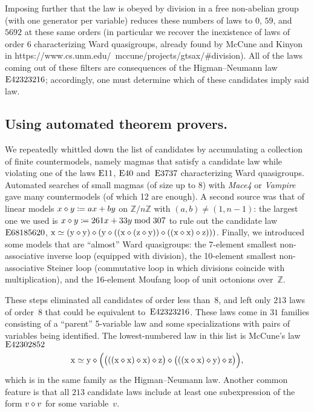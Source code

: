 Imposing further that the law is obeyed by division in a free non-abelian group (with one generator per variable) reduces these numbers of laws to $0$, $59$, and $\num{5692}$ at these same orders (in particular we recover the inexistence of laws of order 6 characterizing Ward quasigroups, already found by McCune and Kinyon in https://www.cs.unm.edu/~mccune/projects/gtsax/#division).  All of the laws coming out of these filters are consequences of the Higman--Neumann law~$\mathrm{E}42323216$; accordingly, one must determine which of these candidates imply said law.

\subsection{Using automated theorem provers.}

We repeatedly whittled down the list of candidates by accumulating a collection of finite countermodels, namely magmas that satisfy a candidate law while violating one of the laws $\mathrm{E}11$, $\mathrm{E}40$ and~$\mathrm{E}3737$ characterizing Ward quasigroups.  Automated searches of small magmas (of size up to $8$) with \emph{Mace4} or \emph{Vampire} gave many countermodels (of which 12 are enough).  A second source was that of linear models $x \diamond y \coloneqq ax+by$ on $\mathbb{Z}/n\mathbb{Z}$ with $(a,b)\neq(1,n-1)$: the largest one we used is $x \diamond y \coloneqq 261x + 33y \bmod 307$ to rule out the candidate law $\mathrm{E}68185620$, $\mathrm{x} \simeq (\mathrm{y} \diamond \mathrm{y}) \diamond (\mathrm{y} \diamond ((\mathrm{x} \diamond (\mathrm{z} \diamond \mathrm{y})) \diamond ((\mathrm{x} \diamond \mathrm{x}) \diamond \mathrm{z})))$.  Finally, we introduced some models that are ``almost'' Ward quasigroups: the 7-element smallest non-associative inverse loop (equipped with division), the 10-element smallest non-associative Steiner loop (commutative loop in which divisions coincide with multiplication), and the 16-element Moufang loop of unit octonions over~$\mathbb{Z}$.

These steps eliminated all candidates of order less than~$8$, and left only $213$ laws of order~$8$ that could be equivalent to~$\mathrm{E}42323216$.  These laws come in $31$ families consisting of a ``parent'' 5-variable law and some specializations with pairs of variables being identified.  The lowest-numbered law in this list is McCune's law~$\mathrm{E}42302852$
\[
\mathrm{x} \simeq \mathrm{y} \diamond \Bigl(\bigl(((\mathrm{x} \diamond \mathrm{x}) \diamond \mathrm{x}) \diamond \mathrm{z}\bigr) \diamond \bigl(((\mathrm{x} \diamond \mathrm{x}) \diamond \mathrm{y}) \diamond \mathrm{z}\bigr)\Bigr) ,
\]
which is in the same family as the Higman--Neumann law.  Another common feature is that all $213$ candidate laws include at least one subexpression of the form $v \diamond v$ for some variable~$v$.

